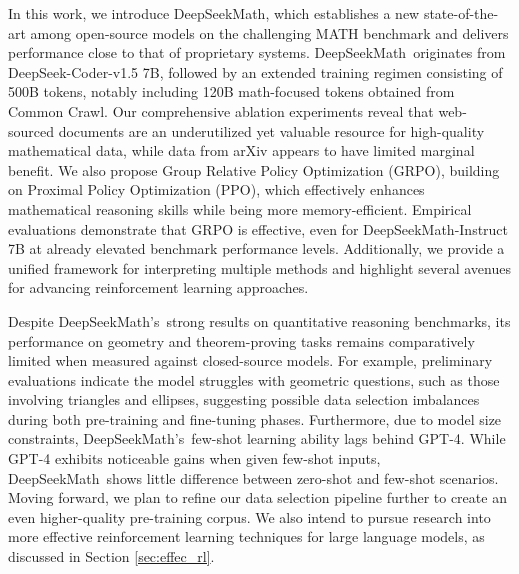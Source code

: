 In this work, we introduce DeepSeekMath, which establishes a new state-of-the-art among open-source models on the challenging MATH benchmark and delivers performance close to that of proprietary systems. DeepSeekMath~originates from DeepSeek-Coder-v1.5 7B, followed by an extended training regimen consisting of 500B tokens, notably including 120B math-focused tokens obtained from Common Crawl. Our comprehensive ablation experiments reveal that web-sourced documents are an underutilized yet valuable resource for high-quality mathematical data, while data from arXiv appears to have limited marginal benefit. We also propose Group Relative Policy Optimization (GRPO), building on Proximal Policy Optimization (PPO), which effectively enhances mathematical reasoning skills while being more memory-efficient. Empirical evaluations demonstrate that GRPO is effective, even for DeepSeekMath-Instruct 7B at already elevated benchmark performance levels. Additionally, we provide a unified framework for interpreting multiple methods and highlight several avenues for advancing reinforcement learning approaches.

Despite DeepSeekMath's~strong results on quantitative reasoning benchmarks, its performance on geometry and theorem-proving tasks remains comparatively limited when measured against closed-source models. For example, preliminary evaluations indicate the model struggles with geometric questions, such as those involving triangles and ellipses, suggesting possible data selection imbalances during both pre-training and fine-tuning phases. Furthermore, due to model size constraints, DeepSeekMath's~few-shot learning ability lags behind GPT-4. While GPT-4 exhibits noticeable gains when given few-shot inputs, DeepSeekMath~shows little difference between zero-shot and few-shot scenarios. Moving forward, we plan to refine our data selection pipeline further to create an even higher-quality pre-training corpus. We also intend to pursue research into more effective reinforcement learning techniques for large language models, as discussed in Section \ref{sec:effec_rl}.

